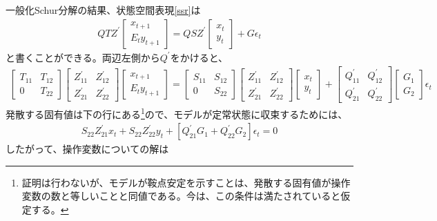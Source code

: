 \documentclass[a4j, dvipdfmx]{jarticle}
\begin{document}
一般化Schur分解の結果、状態空間表現\eqref{ssr}は
\begin{align}
QTZ^\prime \begin{bmatrix}x_{t+1}\\E_ty_{t+1}\end{bmatrix} = QSZ^\prime \begin{bmatrix}x_t\\y_t\end{bmatrix} + G\epsilon_t
\end{align}
と書くことができる。両辺左側から$Q^\prime$をかけると、
\begin{align}
\begin{bmatrix}T_{11} & T_{12} \\ 0 & T_{22}\end{bmatrix}\begin{bmatrix}Z^\prime_{11} & Z^\prime_{12} \\ Z^\prime_{21} & Z^\prime_{22}\end{bmatrix}\begin{bmatrix}x_{t+1} \\ E_ty_{t+1}\end{bmatrix}=\begin{bmatrix}S_{11} & S_{12} \\ 0 & S_{22}\end{bmatrix}\begin{bmatrix}Z^\prime_{11} & Z^\prime_{12} \\ Z^\prime_{21} & Z^\prime_{22}\end{bmatrix}\begin{bmatrix}x_t \\ y_t\end{bmatrix} + \begin{bmatrix}Q^\prime_{11} & Q^\prime_{12} \\ Q^\prime_{21} & Q^\prime_{22}\end{bmatrix}\begin{bmatrix}G_{1} \\ G_{2}\end{bmatrix}\epsilon_t
\end{align}
発散する固有値は下の行にある\footnote{証明は行わないが、モデルが鞍点安定を示すことは、発散する固有値が操作変数の数と等しいことと同値である。今は、この条件は満たされていると仮定する。}ので、モデルが定常状態に収束するためには、
\begin{align}
S_{22}Z^\prime_{21}x_t + S_{22}Z^\prime_{22}y_t + [Q^\prime_{21}G_{1}+Q^\prime_{22}G_2]\epsilon_t=0
\end{align}
したがって、操作変数についての解は
\end{document}

